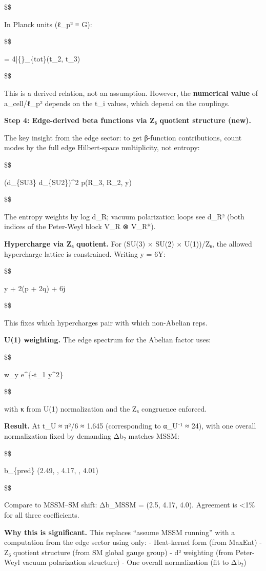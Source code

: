 \documentclass[11pt,a4paper]{article}
\theoremstyle{remark}
\begin{document}
\$\$

In Planck units (ℓ\_p² ≡ G):

\$\$

 = 4\bar\{\ell\}\_\{\rm tot\}(t\_2, t\_3)

\$\$

This is a derived relation, not an assumption. However, the \textbf{numerical value} of a\_cell/ℓ\_p² depends on the t\_i values, which depend on the couplings.

\textbf{Step 4: Edge-derived beta functions via Z₆ quotient structure (new).}

The key insight from the edge sector: to get β-function contributions, count modes by the full edge Hilbert-space multiplicity, not entropy:

\$\$

 \propto (d\_\{\rm SU3\} \cdot d\_\{\rm SU2\})\^{}2 \cdot p(R\_3, R\_2, y)

\$\$

The entropy weights by log d\_R; vacuum polarization loops see d\_R² (both indices of the Peter-Weyl block V\_R ⊗ V\_R*).

\textbf{Hypercharge via Z₆ quotient.} For (SU(3) × SU(2) × U(1))/Z₆, the allowed hypercharge lattice is constrained. Writing y = 6Y:

\$\$

y + 2(p + 2q) + 6j  

\$\$

This fixes which hypercharges pair with which non-Abelian reps.

\textbf{U(1) weighting.} The edge spectrum for the Abelian factor uses:

\$\$

w\_y \propto e\^{}\{-t\_1 \kappa y\^{}2\}

\$\$

with κ from U(1) normalization and the Z₆ congruence enforced.

\textbf{Result.} At t\_U ≈ π²/6 ≈ 1.645 (corresponding to α\_U⁻¹ ≈ 24), with one overall normalization fixed by demanding Δb₂ matches MSSM:

\$\$

\Delta b\_\{\rm pred\} \approx (2.49, , 4.17, , 4.01)

\$\$

Compare to MSSM--SM shift: Δb\_MSSM = (2.5, 4.17, 4.0). Agreement is \textless1\% for all three coefficients.

\textbf{Why this is significant.} This replaces ``assume MSSM running'' with a computation from the edge sector using only:
- Heat-kernel form (from MaxEnt)
- Z₆ quotient structure (from SM global gauge group)
- d² weighting (from Peter-Weyl vacuum polarization structure)
- One overall normalization (fit to Δb₂)
\end{document}
